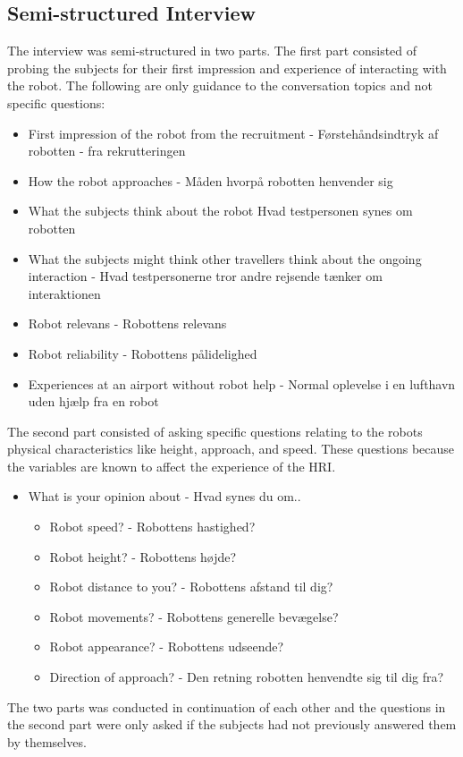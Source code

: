 \subsection{Semi-structured Interview}
The interview was semi-structured in two parts. The first part consisted of probing the subjects for their first impression and experience of interacting with the robot. The following are only guidance to the conversation topics and not specific questions: 
%
\begin{itemize}
\item First impression of the robot from the recruitment -  Førstehåndsindtryk af robotten - fra rekrutteringen
\item How the robot approaches - Måden hvorpå robotten henvender sig
\item What the subjects think about the robot Hvad testpersonen synes om robotten
\item What the subjects might think other travellers think about the ongoing interaction - Hvad testpersonerne tror andre rejsende tænker om interaktionen 
\item Robot relevans - Robottens relevans
\item Robot reliability - Robottens pålidelighed
\item Experiences at an airport without robot help - Normal oplevelse i en lufthavn uden hjælp fra en robot 
\end{itemize}
\noindent
%
The second part consisted of asking specific questions relating to the robots physical characteristics like height, approach, and speed. These questions because the variables are known to affect the experience of the HRI.
%
\begin{itemize}
\item What is your opinion about - Hvad synes du om..
	\begin{itemize}
		\item Robot speed? - Robottens hastighed?
		\item Robot height? - Robottens højde?
		\item Robot distance to you? - Robottens afstand til dig?
		\item Robot movements? - Robottens generelle bevægelse?
		\item Robot appearance? -  Robottens udseende?
		\item Direction of approach? - Den retning robotten henvendte sig til dig fra?
	\end{itemize}
\end{itemize}
%
The two parts was conducted in continuation of each other and the questions in the second part were only asked if the subjects had not previously answered them by themselves.
 
